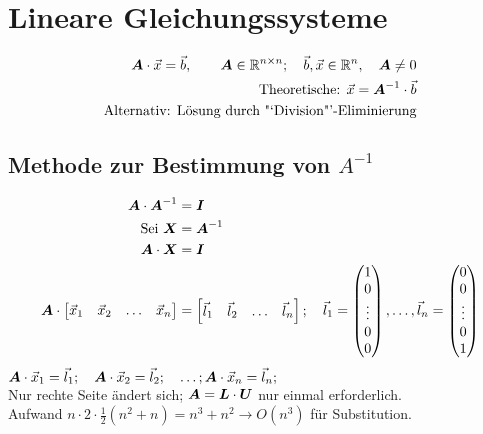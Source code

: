 \chapter{Lineare Gleichungssysteme}
\begin{align}
	\boldsymbol {A} \cdot \vec{x} = \vec{b}, \qquad \boldsymbol {A} \in \mathbb{R}^{n\times n}; \quad \vec{b}, \vec{x} \in \mathbb{R}^n, \quad \boldsymbol {A} \neq 0\\
	\text{Theoretische: } \vec{x} = \boldsymbol {A}^{-1} \cdot \vec{b}\\
	\text{Alternativ: Lösung durch "`Division"'-Eliminierung} 
\end{align}

\section{Methode zur Bestimmung von $A^{-1}$}
\begin{align}
	\boldsymbol {A}\cdot\boldsymbol {A}^{-1} &= \boldsymbol {I}\\
	\text{Sei }\boldsymbol {X} &= \boldsymbol {A}^{-1}\\
	\boldsymbol {A}\cdot\boldsymbol {X} &= \boldsymbol {I}\\
	\boldsymbol {A}\cdot\begin{bmatrix}
	\vec{x}_1 & \vec{x}_2 & \ldots & \vec{x}_n
	\end{bmatrix} &= \begin{bmatrix}
	\vec{l}_1 & \vec{l}_2 & \ldots & \vec{l}_n
	\end{bmatrix};\quad\vec{l}_1 = \begin{pmatrix}
	1\\ 0\\ \vdots\\ 0\\ 0
	\end{pmatrix}, \ldots, \vec{l}_n = \begin{pmatrix}
	0\\ 0\\ \vdots\\ 0\\ 1
	\end{pmatrix}
\end{align}
$\boldsymbol {A}\cdot\vec{x}_1 = \vec{l}_1;\quad\boldsymbol {A}\cdot\vec{x}_2 = \vec{l}_2;\quad\ldots;\boldsymbol {A}\cdot\vec{x}_n = \vec{l}_n;$\\
Nur rechte Seite ändert sich; $\boldsymbol {A} = \boldsymbol {L}\cdot\boldsymbol {U}$ nur einmal erforderlich.\\
Aufwand $n\cdot 2\cdot\frac{1}{2}(n^2 + n) = n^3 + n^2 \rightarrow O(n^3)$ für Substitution.

